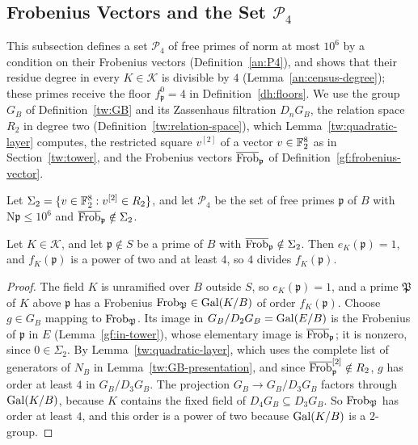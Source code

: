 \subsection{Frobenius Vectors and the Set $\mathcal P_4$}
\label{an:census}
This subsection defines a set $\mathcal P_4$ of free primes of norm at
most $10^6$ by a condition on their Frobenius vectors
(Definition~\ref{an:P4}), and shows that their residue degree in every
$K\in\mathcal K$ is divisible by $4$ (Lemma~\ref{an:census-degree}); these
primes receive the floor
$f^0_{\mathfrak p}=4$ in Definition~\ref{dh:floors}. We use the group $G_B$ of Definition~\ref{tw:GB} and its Zassenhaus
filtration $D_nG_B$, the relation space $R_2$ in degree two
(Definition~\ref{tw:relation-space}), which Lemma~\ref{tw:quadratic-layer}
computes, the restricted square $v^{[2]}$ of a vector $v\in\mathbb F_2^8$ as in
Section~\ref{tw:tower}, and the Frobenius vectors
$\overline{\operatorname{Frob}}_{\mathfrak p}$ of Definition~\ref{gf:frobenius-vector}.

\begin{definition}\label{an:P4}
Let $\Sigma_2=\{v\in\mathbb F_2^8:v^{[2]}\in R_2\}$, and let $\mathcal P_4$ be the
set of free primes $\mathfrak p$ of $B$ with $\mathrm N\mathfrak p\le10^6$
and $\overline{\operatorname{Frob}}_{\mathfrak p}\notin\Sigma_2$.
\end{definition}

\begin{lemma}\label{an:census-degree}
Let $K\in\mathcal K$, and let $\mathfrak p\notin S$ be a prime of $B$ with
$\overline{\operatorname{Frob}}_{\mathfrak p}\notin\Sigma_2$. Then $e_K(\mathfrak p)=1$, and
$f_K(\mathfrak p)$ is a power of two and at least $4$, so $4$ divides
$f_K(\mathfrak p)$.
\end{lemma}

\begin{proof}
The field $K$ is unramified over $B$ outside $S$, so $e_K(\mathfrak p)=1$,
and a prime $\mathfrak P$ of $K$ above $\mathfrak p$ has a Frobenius
$\operatorname{Frob}_{\mathfrak P}\in\operatorname{Gal}(K/B)$ of order $f_K(\mathfrak p)$. Choose
$g\in G_B$ mapping to $\operatorname{Frob}_{\mathfrak P}$. Its image in
$G_B/D_2G_B=\operatorname{Gal}(E/B)$ is the Frobenius of $\mathfrak p$ in $E$
(Lemma~\ref{gf:in-tower}), whose elementary image is $\overline{\operatorname{Frob}}_{\mathfrak p}$; it is
nonzero, since $0\in\Sigma_2$. By Lemma~\ref{tw:quadratic-layer}, which uses
the complete list of generators of $N_B$ in
Lemma~\ref{tw:GB-presentation}, and since $\overline{\operatorname{Frob}}_{\mathfrak p}^{[2]}\notin R_2$,
$g$ has order at least $4$ in $G_B/D_3G_B$. The projection $G_B\to G_B/D_3G_B$
factors through $\operatorname{Gal}(K/B)$, because $K$ contains the fixed field of
$D_4G_B\subseteq D_3G_B$. So $\operatorname{Frob}_{\mathfrak P}$ has order at least $4$, and
this order is a power of two because $\operatorname{Gal}(K/B)$ is a $2$-group.
\end{proof}


